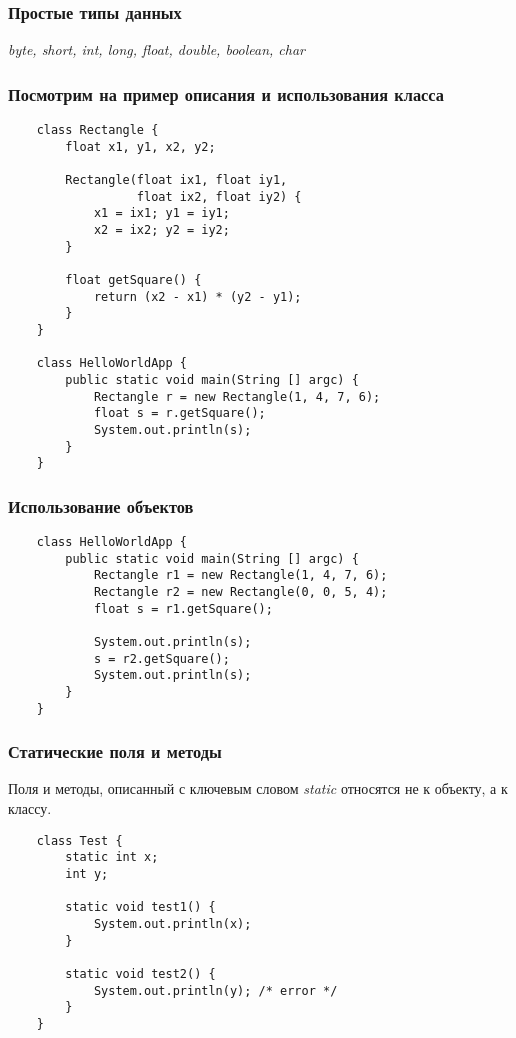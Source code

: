 \begin{frame}
	\frametitle{Простые типы данных}

	\begin{LARGE}
	\emph{byte, short, int, long, float, double, boolean, char}
	\end{LARGE}
\end{frame}

\begin{frame}[fragile]
	\frametitle{Посмотрим на пример описания и использования класса}
	\begin{verbatim}
	class Rectangle {
	    float x1, y1, x2, y2; 

	    Rectangle(float ix1, float iy1,
	              float ix2, float iy2) {
	        x1 = ix1; y1 = iy1;
	        x2 = ix2; y2 = iy2;
	    }   

	    float getSquare() {
	        return (x2 - x1) * (y2 - y1);
	    }   
	}

	class HelloWorldApp {
	    public static void main(String [] argc) {
	        Rectangle r = new Rectangle(1, 4, 7, 6);
	        float s = r.getSquare();
	        System.out.println(s);
	    }   
	}
	\end{verbatim}
\end{frame}

\begin{frame}[fragile]
	\frametitle{Использование объектов}

	\begin{verbatim}
	class HelloWorldApp {
	    public static void main(String [] argc) {
	        Rectangle r1 = new Rectangle(1, 4, 7, 6);
	        Rectangle r2 = new Rectangle(0, 0, 5, 4);
	        float s = r1.getSquare();

	        System.out.println(s);
	        s = r2.getSquare();
	        System.out.println(s);
	    }
	}
	\end{verbatim}
\end{frame}


\begin{frame}[fragile]
	\frametitle{Статические поля и методы}

	\begin{large}
	Поля и методы, описанный с ключевым словом \emph{static} относятся не к объекту, а к классу.
	\end{large}

	\medskip
	\begin{verbatim}
	class Test {
	    static int x;
	    int y;

	    static void test1() {
	        System.out.println(x);
	    }

	    static void test2() {
	        System.out.println(y); /* error */
	    }
	}
	\end{verbatim}
\end{frame}

